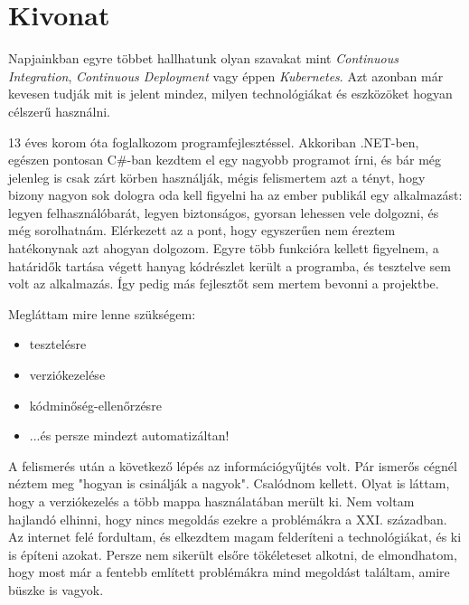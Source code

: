 
\setcounter{page}{1}

\selecthungarian

\chapter*{Kivonat}

Napjainkban egyre többet hallhatunk olyan szavakat mint \textit{Continuous Integration}, \textit{Continuous Deployment} vagy éppen \textit{Kubernetes}. Azt azonban már kevesen tudják mit is jelent mindez, milyen technológiákat és eszközöket hogyan célszerű használni.

13 éves korom óta foglalkozom programfejlesztéssel. Akkoriban .NET-ben, egészen pontosan C\#-ban kezdtem el egy nagyobb programot írni, és bár még jelenleg is csak zárt körben használják, mégis felismertem azt a tényt, hogy bizony nagyon sok dologra oda kell figyelni ha az ember publikál egy alkalmazást: legyen felhasználóbarát, legyen biztonságos, gyorsan lehessen vele dolgozni, és még sorolhatnám. Elérkezett az a pont, hogy egyszerűen nem éreztem hatékonynak azt ahogyan dolgozom. Egyre több funkcióra kellett figyelnem, a határidők tartása végett hanyag kódrészlet került a programba, és tesztelve sem volt az alkalmazás. Így pedig más fejlesztőt sem mertem bevonni a projektbe.

Megláttam mire lenne szükségem:
\begin{itemize}
    \item tesztelésre
    \item verziókezelése
    \item kódminőség-ellenőrzésre
    \item ...és persze mindezt automatizáltan!
\end{itemize}

A felismerés után a következő lépés az információgyűjtés volt. Pár ismerős cégnél néztem meg "hogyan is csinálják a nagyok". Csalódnom kellett. Olyat is láttam, hogy a verziókezelés a több mappa használatában merült ki. Nem voltam hajlandó elhinni, hogy nincs megoldás ezekre a problémákra a XXI. században. Az internet felé fordultam, és elkezdtem magam felderíteni a technológiákat, és ki is építeni azokat. Persze nem sikerült elsőre tökéleteset alkotni, de elmondhatom, hogy most már a fentebb említett problémákra mind megoldást találtam, amire büszke is vagyok.

